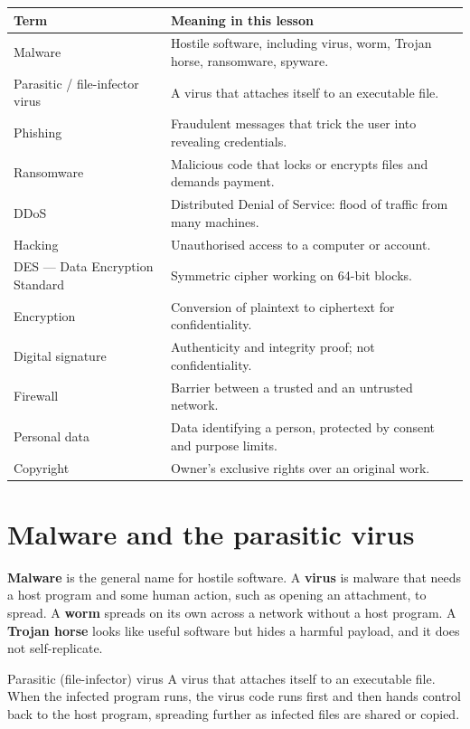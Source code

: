 \begin{center}
\begin{tabular}{p{}p{}}
\toprule
\textbf{Term} & \textbf{Meaning in this lesson} \\
\midrule
Malware & Hostile software, including virus, worm, Trojan horse, ransomware, spyware. \\
Parasitic / file-infector virus & A virus that attaches itself to an executable file. \\
Phishing & Fraudulent messages that trick the user into revealing credentials. \\
Ransomware & Malicious code that locks or encrypts files and demands payment. \\
DDoS & Distributed Denial of Service: flood of traffic from many machines. \\
Hacking & Unauthorised access to a computer or account. \\
DES --- Data Encryption Standard & Symmetric cipher working on 64-bit blocks. \\
Encryption & Conversion of plaintext to ciphertext for confidentiality. \\
Digital signature & Authenticity and integrity proof; not confidentiality. \\
Firewall & Barrier between a trusted and an untrusted network. \\
Personal data & Data identifying a person, protected by consent and purpose limits. \\
Copyright & Owner's exclusive rights over an original work. \\
\bottomrule
\end{tabular}
\end{center}

\section{Malware and the parasitic virus}
\textbf{Malware} is the general name for hostile software. A \textbf{virus}
is malware that needs a host program and some human action, such as opening
an attachment, to spread. A \textbf{worm} spreads on its own across a
network without a host program. A \textbf{Trojan horse} looks like useful
software but hides a harmful payload, and it does not self-replicate.

\begin{definitionbox}{Parasitic (file-infector) virus}
A virus that attaches itself to an executable file. When the infected program
runs, the virus code runs first and then hands control back to the host
program, spreading further as infected files are shared or copied.
\end{definitionbox}

